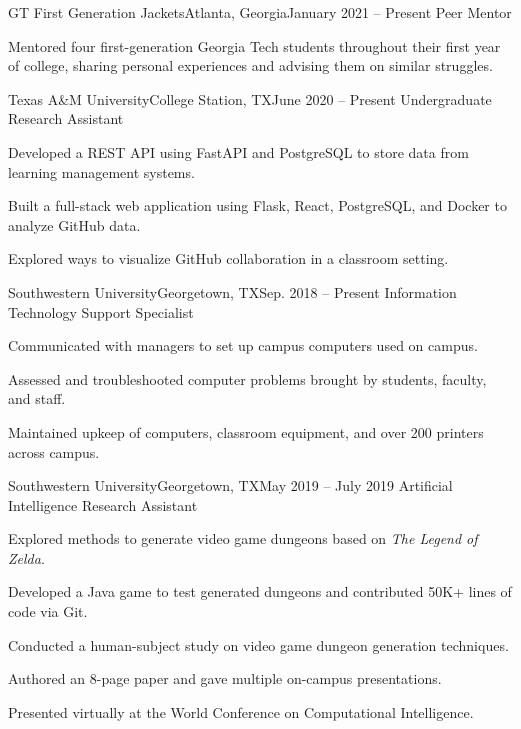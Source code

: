 \begin{resume-itemize}
  {GT First Generation Jackets}{Atlanta, Georgia}{January 2021 -- Present}
  {Peer Mentor}
  \item Mentored four first-generation Georgia Tech students throughout their first year of college, sharing personal experiences and advising them on similar struggles.
\end{resume-itemize}
\begin{resume-itemize}
  {Texas A\&M University}{College Station, TX}{June 2020 -- Present}
  {Undergraduate Research Assistant}
    \item Developed a REST API using FastAPI and PostgreSQL to store data from learning management systems.
    \item Built a full-stack web application using Flask, React, PostgreSQL, and Docker to analyze GitHub data.
    \item Explored ways to visualize GitHub collaboration in a classroom setting.
\end{resume-itemize}
\begin{resume-itemize}
  {Southwestern University}{Georgetown, TX}{Sep. 2018 -- Present}
  {Information Technology Support Specialist}
    \item Communicated with managers to set up campus computers used on campus.
    \item Assessed and troubleshooted computer problems brought by students, faculty, and staff.
    \item Maintained upkeep of computers, classroom equipment, and over 200 printers across campus.
\end{resume-itemize}
\begin{resume-itemize}
  {Southwestern University}{Georgetown, TX}{May 2019 -- July 2019}
  {Artificial Intelligence Research Assistant}
    \item Explored methods to generate video game dungeons based on \emph{The Legend of Zelda}.
    \item Developed a Java game to test generated dungeons and contributed 50K+ lines of code via Git.
    \item Conducted a human-subject study on video game dungeon generation techniques.
    \item Authored an 8-page paper and gave multiple on-campus presentations.
    \item Presented virtually at the World Conference on Computational Intelligence.
\end{resume-itemize}


